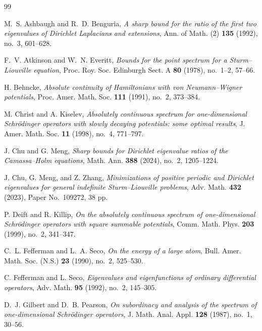 \documentclass[12pt]{amsart}
\theoremstyle{plain}
\theoremstyle{definition}
\begin{document}
\begin{thebibliography}{99}
	
	M.~S. Ashbaugh and R.~D. Benguria,
	\emph{A sharp bound for the ratio of the first two eigenvalues of
		Dirichlet Laplacians and extensions},
	Ann. of Math. (2) \textbf{135} (1992), no.~3, 601--628.
	
	F.~V. Atkinson and W.~N. Everitt,
	\emph{Bounds for the point spectrum for a Sturm--Liouville equation},
	Proc. Roy. Soc. Edinburgh Sect. A \textbf{80} (1978), no.~1--2, 57--66.
	
	H. Behncke,
	\emph{Absolute continuity of Hamiltonians with von Neumann--Wigner
		potentials},
	Proc. Amer. Math. Soc. \textbf{111} (1991), no.~2, 373--384.
	
	M. Christ and A. Kiselev,
	\emph{Absolutely continuous spectrum for one-dimensional Schr\"odinger
		operators with slowly decaying potentials: some optimal results},
	J. Amer. Math. Soc. \textbf{11} (1998), no.~4, 771--797.
	
J. Chu and G. Meng,
\emph{Sharp bounds for Dirichlet eigenvalue ratios of the
	Camassa--Holm equations},
Math. Ann. \textbf{388} (2024), no.~2, 1205--1224.
	
	J. Chu, G. Meng, and Z. Zhang,
	\emph{Minimizations of positive periodic and Dirichlet eigenvalues for
		general indefinite Sturm--Liouville problems},
	Adv. Math. \textbf{432} (2023), Paper No.~109272, 38 pp.
	
	
	P. Deift and R. Killip,
	\emph{On the absolutely continuous spectrum of one-dimensional
		Schr\"odinger operators with square summable potentials},
	Comm. Math. Phys. \textbf{203} (1999), no.~2, 341--347.
	
	C.~L. Fefferman and L.~A. Seco,
	\emph{On the energy of a large atom},
	Bull. Amer. Math. Soc. (N.S.) \textbf{23} (1990), no.~2, 525--530.
	
	C. Fefferman and L. Seco,
	\emph{Eigenvalues and eigenfunctions of ordinary differential
		operators},
	Adv. Math. \textbf{95} (1992), no.~2, 145--305.
	
	
	
	D.~J. Gilbert and D.~B. Pearson,
	\emph{On subordinacy and analysis of the spectrum of one-dimensional
		Schr\"odinger operators},
	J. Math. Anal. Appl. \textbf{128} (1987), no.~1, 30--56.
	

\end{thebibliography}
\end{document}
